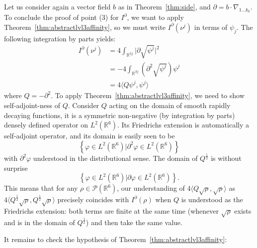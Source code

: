 \documentclass[11pt,a4paper]{article}
\theoremstyle{definition}
\theoremstyle{plain}
\begin{document}
Let us consider again a vector field $b$ as in Theorem~\ref{thm:side}, and $\partial=b\cdot\nabla_{1...k_0}$.
To conclude the proof of point (3) for $I^\partial$, we want to apply Theorem~\ref{thm:abstractlvl3affinity}, so we must write $I^\partial(\nu^j)$ in terms of $\psi_j$. The following integration by parts yields:
\begin{align*}
    I^\partial(\nu^j)&=4\int_{\mathbb{R}^{3j}} \vert \partial  \sqrt{\psi^j}\vert^2\\
    &=-4\int_{\mathbb{R}^{3j}} (\partial^2  \sqrt{\psi^j}) \psi^j\\
    &=4\langle Q\psi^j,\psi^j\rangle
\end{align*}
where $Q=-\partial^2$. To apply Theorem~\ref{thm:abstractlvl3affinity}, we need to show self-adjoint-ness of $Q$. Consider $Q$ acting on the domain of smooth rapidly decaying functions, it is a symmetric non-negative (by integration by parts) densely defined operator on $L^2(\mathbb{R}^6)$. Its Friedrichs extension \cite{AkhiezerGlazman2013, Friedrichs1934} is automatically a self-adjoint operator, and its domain is easily seen to be
$$\left\{ \varphi \in L^2(\mathbb{R}^6) \vert \partial^2\varphi \in L^2(\mathbb{R}^6)  \right\}$$
with $\partial^2\varphi$ understood in the distributional sense. The domain of $Q^{\frac{1}{2}}$ is without surprise
$$\left\{ \varphi \in L^2(\mathbb{R}^6) \vert \partial \varphi \in L^2(\mathbb{R}^6) \right \}.$$
This means that for any $\rho\in \mathcal{P}(\mathbb{R}^6)$, our understanding of $4\langle Q\sqrt{\rho}, \sqrt{\rho}\rangle$ as $4\langle Q^\frac{1}{2}\sqrt{\rho},Q^\frac{1}{2} \sqrt{\rho}\rangle$ precisely coincides with $I^\partial(\rho)$ when $Q$ is understood as the Friedrichs extension: both terms are finite at the same time (whenever $\sqrt{\rho}$ exists and is in the domain of $Q^{\frac{1}{2}}$) and then take the same value.

It remains to check the hypothesis of Theorem~\ref{thm:abstractlvl3affinity}: 
\end{document}
